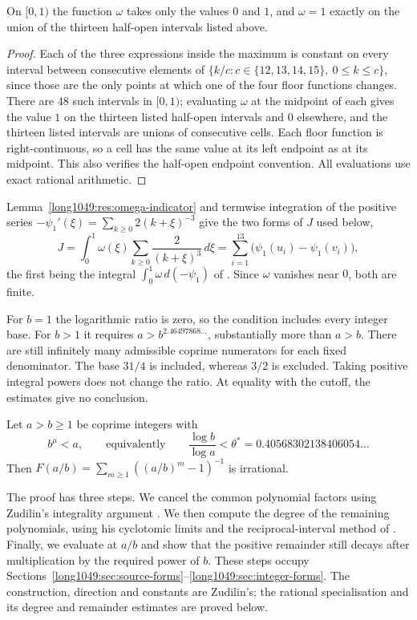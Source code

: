 \documentclass[11pt]{article}
\begin{document}
\begin{lemma}\label{long1049:res:omega-indicator}
On $[0,1)$ the function $\omega$ takes only the values $0$ and $1$, and
$\omega=1$ exactly on the union of the thirteen half-open intervals listed above.
\end{lemma}

\begin{proof}
Each of the three expressions inside the maximum is constant on every interval
between consecutive elements of
$\{k/c: c\in\{12,13,14,15\},\ 0\le k\le c\}$, since those are the only points at
which one of the four floor functions changes.  There are $48$ such intervals in
$[0,1)$; evaluating $\omega$ at the midpoint of each gives the value $1$ on the
thirteen listed half-open intervals and $0$ elsewhere, and the thirteen listed
intervals are unions of consecutive cells. Each floor function is
right-continuous, so a cell has the same value at its left endpoint as
at its midpoint. This also verifies the half-open endpoint convention.
All evaluations use exact rational arithmetic.
\end{proof}

\noindent Lemma~\ref{long1049:res:omega-indicator} and termwise integration of the positive series
$-\psi_1'(\xi)=\sum_{k\ge0}2(k+\xi)^{-3}$ give the two forms of $J$ used below,
\[
 J=\int_0^1\omega(\xi)\sum_{k\ge0}\frac{2}{(k+\xi)^{3}}\,d\xi
  =\sum_{i=1}^{13}\bigl(\psi_1(u_i)-\psi_1(v_i)\bigr),
\]
the first being the integral $\int_0^1\omega\,d(-\psi_1)$ of
\cite[Lemma~2, p.~155, and (26), p.~162]{zudilin2004}.  Since $\omega$ vanishes
near $0$, both are finite.

For $b=1$ the logarithmic ratio is zero, so the condition includes every
integer base. For $b>1$ it requires $a>b^{2.46497868\ldots}$, substantially
more than $a>b$. There are still infinitely many admissible coprime
numerators for each fixed denominator. The base $31/4$ is included,
whereas $3/2$ is excluded. Taking positive integral powers does not
change the ratio. At equality with the cutoff, the estimates give no
conclusion.

\begin{theorem}\label{long1049:res:region}
Let $a>b\ge1$ be coprime integers with
\[
 b^{\mu}<a,
 \qquad\text{equivalently}\qquad
 \frac{\log b}{\log a}<\theta^{*}=0.40568302138406054\ldots
\]
Then $F(a/b)=\sum_{m\ge1}(( a/b)^{m}-1)^{-1}$ is irrational.
\end{theorem}

The proof has three steps. We cancel the common polynomial factors
using Zudilin's integrality argument \cite[pp.~156--161]{zudilin2004}.
We then compute the degree of the remaining polynomials, using his
cyclotomic limits and the reciprocal-interval method of
\cite[Lemma~1, p.~466]{zudilin2002}. Finally, we evaluate at $a/b$
and show that the positive remainder still decays after multiplication
by the required power of $b$. These steps occupy
Sections~\ref{long1049:sec:source-forms}--\ref{long1049:sec:integer-forms}.
The construction, direction and constants are Zudilin's; the rational
specialisation and its degree and remainder estimates are proved below.
\end{document}
